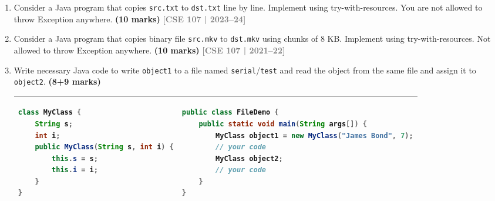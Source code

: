 \documentclass[12pt,a3paper]{article}
\newcommand{\yr}[1]{\hfill\textcolor{gray}{\small\textbf{[#1]}}}
\newcommand{\mk}[1]{\textcolor{orange!70!black}{\small\textbf{(#1 marks)}}}
\begin{document}
\begin{enumerate}




\item Consider a Java program that copies \texttt{src.txt} to \texttt{dst.txt} line by line. Implement using try-with-resources. You are not allowed to throw Exception anywhere. \mk{10}
\yr{CSE 107 | 2023--24}





\item Consider a Java program that copies binary file \texttt{src.mkv} to \texttt{dst.mkv} using chunks of 8 KB. Implement using try-with-resources. Not allowed to throw Exception anywhere. \mk{10}
\yr{CSE 107 | 2021--22}





\item Write necessary Java code to write \texttt{object1} to a file named \texttt{serial}/\texttt{test} and read the object from the same file and assign it to \texttt{object2}. \mk{8+9}

\begin{center}
\begin{tabular}{|p{}|p{}|}
\hline
\begin{minipage}[t]{0.45\textwidth}
\begin{lstlisting}[language=Java, basicstyle=\ttfamily\small, tabsize=4]
class MyClass {
    String s;
    int i;
    public MyClass(String s, int i) {
        this.s = s;
        this.i = i;
    }
}
\end{lstlisting}
\end{minipage} & 
\begin{minipage}[t]{0.5\textwidth}
\begin{lstlisting}[language=Java, basicstyle=\ttfamily\small, tabsize=4]
public class FileDemo {
    public static void main(String args[]) {
        MyClass object1 = new MyClass("James Bond", 7);
        // your code
        MyClass object2;
        // your code
    }
}
\end{lstlisting}
\end{minipage} \\
\hline
\end{tabular}
\end{center}


\end{enumerate}
\end{document}
